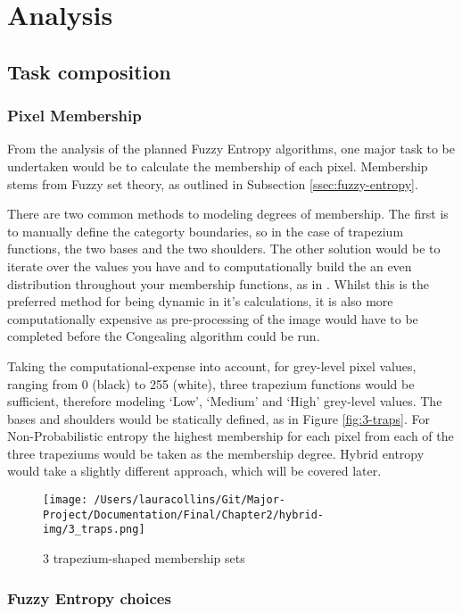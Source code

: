 \section{Analysis}

\subsection{Task composition}

\subsubsection{Pixel Membership}

From the analysis of the planned Fuzzy Entropy algorithms, one major task to be undertaken would be to calculate the membership of each pixel. Membership stems from Fuzzy set theory, as outlined in Subsection \ref{ssec:fuzzy-entropy}.

There are two common methods to modeling degrees of membership. The first is to manually define the categorty boundaries, so in the case of trapezium functions, the two bases and the two shoulders. The other solution would be to iterate over the values you have and to computationally build the an even distribution throughout your membership functions, as in \cite{Mac_Parthalain_Strange_2013}. Whilst this is the preferred method for being dynamic in it's calculations, it is also more computationally expensive as pre-processing of the image would have to be completed before the Congealing algorithm could be run.

Taking the computational-expense into account, for grey-level pixel values, ranging from 0 (black) to 255 (white), three trapezium functions would be sufficient, therefore modeling `Low', `Medium' and `High' grey-level values. The bases and shoulders would be statically defined, as in Figure \ref{fig:3-traps}. For Non-Probabilistic entropy the highest membership for each pixel from each of the three trapeziums would be taken as the membership degree. Hybrid entropy would take a slightly different approach, which will be covered later.

\begin{figure}[H]
  \center
  \texttt{[image: /Users/lauracollins/Git/Major-Project/Documentation/Final/Chapter2/hybrid-img/3\_traps.png]}
  \caption{3 trapezium-shaped membership sets}
  \label{fig:3-trapeziums}
\end{figure}

\subsubsection{Fuzzy Entropy choices}

